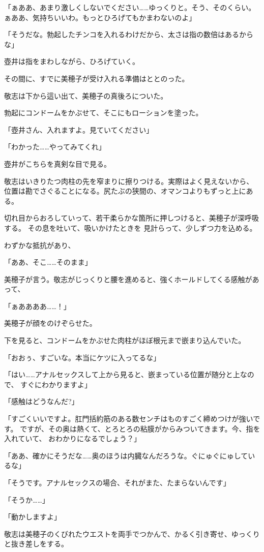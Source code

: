 ﻿\documentclass[
    book,tate,
    line_length=30zw,
    jafontsize=12pt,
    paper=b5j,
    landscape,
    ]{jlreq}
\begin{document}
「ぁああ、あまり激しくしないでください……ゆっくりと。そう、そのくらい。
ぁああ、気持ちいいわ。もっとひろげてもかまわないのよ」

「そうだな。勃起したチンコを入れるわけだから、太さは指の数倍はあるからな」

壺井は指をまわしながら、ひろげていく。

その間に、すでに美穂子が受け入れる準備はととのった。

敬志は下から這い出て、美穂子の真後ろについた。

勃起にコンドームをかぶせて、そこにもローションを塗った。

「壺井さん、入れますよ。見ていてください」

「わかった……やってみてくれ」

壺井がこちらを真剣な目で見る。

敬志はいきりたつ肉柱の先を窄まりに擦りつける。実際はよく見えないから、
位置は勘でさぐることになる。尻たぶの狭間の、オマンコよりもずっと上にある。

切れ目からおろしていって、若干柔らかな箇所に押しつけると、美穂子が深呼吸する。
その息を吐いて、吸いかけたときを 見計らって、少しずつ力を込める。

わずかな抵抗があり、

「ああ、そこ……そのまま」

美穂子が言う。敬志がじっくりと腰を進めると、強くホールドしてくる感触があって、

「ぁああああ……！」

美穂子が顔をのけぞらせた。

下を見ると、コンドームをかぶせた肉柱がほぼ根元まで嵌まり込んでいた。

「おおぅ、すごいな。本当にケツに入ってるな」

「はい……アナルセックスして上から見ると、嵌まっている位置が随分と上なので、
すぐにわかりますよ」

「感触はどうなんだ?」

「すごくいいですよ。肛門括約筋のある数センチはものすごく締めつけが強いです。
ですが、その奥は熱くて、とろとろの粘膜がからみついてきます。今、指を入れていて、
おわかりになるでしょう？」

「ああ、確かにそうだな……奥のほうは内臓なんだろうな。ぐにゅぐにゅしているな」

「そうです。アナルセックスの場合、それがまた、たまらないんです」

「そうか……」

「動かしますよ」

敬志は美穂子のくびれたウエストを両手でつかんで、かるく引き寄せ、ゆっくりと抜き差しをする。
\end{document}
